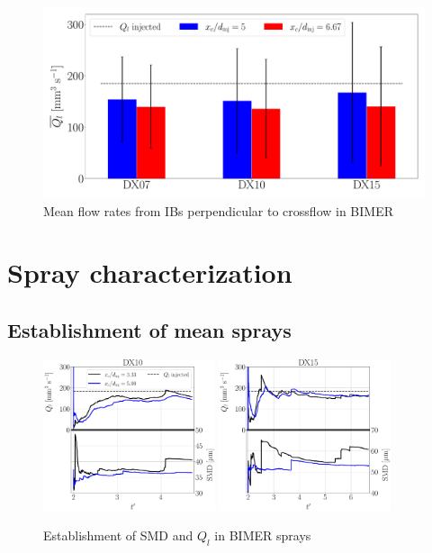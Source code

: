 \begin{figure}[ht]
\centering
   \includegraphics[scale=0.3]{./part3_applications/figures_ch8_resolved/flow_rates_ibs/bar_graph_isox_IBs}
\caption{Mean flow rates from IBs perpendicular to crossflow in BIMER}
\label{fig:BIMER_IB_bargraph_mean}
\end{figure}


\clearpage


\section{Spray characterization}

\subsection{Establishment of mean sprays}

\begin{figure}[ht]
	\centering
   \includegraphics[width=0.45\textwidth]{./part3_applications/figures_ch8_resolved/SPRAY_characterization/establishment_and_fluxes/establishment_DX10}
   \includegraphics[width=0.45\textwidth]{./part3_applications/figures_ch8_resolved/SPRAY_characterization/establishment_and_fluxes/establishment_DX15}
   \caption{Establishment of SMD and $Q_l$ in BIMER sprays}
\label{fig:ch8_spray_char_establishment}
\end{figure}




